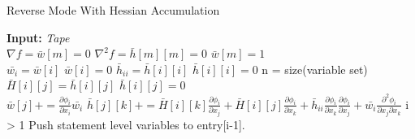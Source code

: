 \documentclass[oneside]{article}
\begin{document}
\begin{algorithm*}[!htb]
  \caption{Reverse Mode With Hessian Accumulation}
  \begin{algorithmic}[1]
\State \textbf{Input:} \textit{Tape} \\
\State $\nabla f = \bar{w}[m] = 0$
\State $\nabla^2 f =  \bar{h}[m][m] = 0$
\State $\bar{w}[m] = 1$ \\
\State $\bar{w_i}=\bar{w}[i]$
\State $\bar{w}[i] = 0$
\State $\bar{h}_{ii}=\bar{h}[i][i]$
\State $\bar{h}[i][i] = 0$
\State n = size(variable set) \\
\State $\bar{H}[i][j] = \bar{h}[i][j]$
\State $\bar{h}[i][j] = 0$
\EndFor \\
\State $\bar{w}[j] +=  \frac{\partial \phi_i}{\partial x_i}\bar{w_i}$
\State  $\bar{h}[j][k] += \bar{H}[i][k]  \frac{\partial  \phi_i}{\partial x_j} + \bar{H}[i][j]  \frac{\partial  \phi_i}{\partial x_k}+\bar{h}_{ii}\frac{\partial  \phi_i}{\partial x_k} \frac{\partial  \phi_i}{\partial x_j} + \bar{w_i}\frac{\partial^2  \phi_i}{\partial x_j \partial x_k}$
\EndFor
\EndFor
\If i > 1
\State Push statement level variables to entry[i-1].

\end{algorithmic}
\end{algorithm*}
\end{document}
